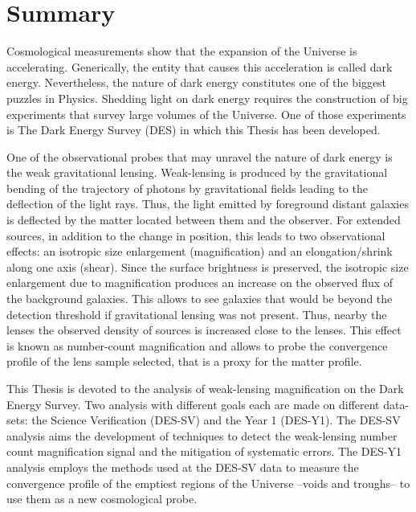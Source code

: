 \chapter*{Summary}
Cosmological measurements show that the expansion of the Universe is accelerating. Generically, the entity that causes this acceleration is called dark energy. Nevertheless, the nature of dark energy constitutes one of the biggest puzzles in Physics. Shedding light on dark energy requires the construction of big experiments that survey large volumes of the Universe. One of those experiments is The Dark Energy Survey (DES) in which this Thesis has been developed.
\newline

One of the observational probes that may unravel the nature of dark energy is the weak gravitational lensing. Weak-lensing is produced by the gravitational bending of the trajectory of photons by gravitational fields leading to the deflection of the light rays. Thus, the light emitted by foreground distant galaxies is deflected by the matter located between them and the observer. For extended sources, in addition to the change in position, this leads to two observational effects: an isotropic size enlargement (magnification) and an elongation/shrink along one axis (shear). Since the surface brightness is preserved, the isotropic size enlargement due to magnification produces an increase on the observed flux of the background galaxies. This allows to see galaxies that would be beyond the detection threshold if gravitational lensing was not present. Thus, nearby the lenses the observed density of sources is increased close to the lenses. This effect is known as number-count magnification and allows to probe the convergence profile of the lens sample selected, that is a proxy for the matter profile.
\newline

This Thesis is devoted to the analysis of weak-lensing magnification on the Dark Energy Survey. Two analysis with different goals each are made on different data-sets: the Science Verification (DES-SV) and the Year 1 (DES-Y1). The DES-SV analysis aims the development of techniques to detect the weak-lensing number count magnification signal and the mitigation of systematic errors. The DES-Y1 analysis employs the methods used at the DES-SV data to measure the convergence profile of the emptiest regions of the Universe --voids and troughs-- to use them as a new cosmological probe.